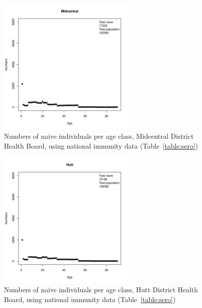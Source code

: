 \documentclass{article}
\begin{document}
\begin{figure}[H]
     \begin{center}
     \includegraphics[width=0.6\textwidth]{dhb12.pdf}
     \end{center}
     \caption{Numbers of naive individuals per age class, Midcentral District Health Board, using national immunity data (Table~\ref{table:sero})}
     \label{fig:Midcentral}
\end{figure}

\begin{figure}[H]
     \begin{center}
     \includegraphics[width=0.6\textwidth]{dhb13.pdf}
     \end{center}
     \caption{Numbers of naive individuals per age class, Hutt District Health Board, using national immunity data (Table~\ref{table:sero})}
     \label{fig:Hutt}
\end{figure}
\end{document}
